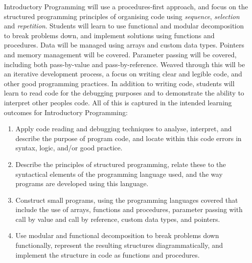 Introductory Programming will use a procedures-first approach, and focus on the structured programming principles of organising code using \emph{sequence}, \emph{selection} and \emph{repetition}. Students will learn to use functional and modular decomposition to break problems down, and implement solutions using functions and procedures. Data will be managed using arrays and custom data types. Pointers and memory management will be covered. Parameter passing will be covered, including both pass-by-value and pass-by-reference. Weaved through this will be an iterative development process, a focus on writing clear and legible code, and other good programming practices. In addition to writing code, students will learn to read code for the debugging purposes and to demonstrate the ability to interpret other peoples code. All of this is captured in the intended learning outcomes for Introductory Programming:
\begin{enumerate}
	\item Apply code reading and debugging techniques to analyse, interpret, and describe the purpose of program code, and locate within this code errors in syntax, logic, and/or good practice.
	\item Describe the principles of structured programming, relate these to the syntactical elements of the programming language used, and the way programs are developed using this language.
	\item Construct small programs, using the programming languages covered that include the use of arrays, functions and procedures, parameter passing with call by value and call by reference, custom data types, and pointers.
	\item Use modular and functional decomposition to break problems down functionally, represent the resulting structures diagrammatically, and implement the structure in code as functions and procedures.
\end{enumerate}

